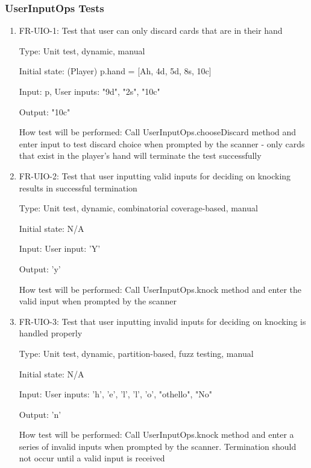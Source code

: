 \documentclass[12pt, titlepage]{article}
\begin{document}
\subsubsection{UserInputOps Tests}
\begin{enumerate}
    \item{FR-UIO-1: Test that user can only discard cards that are in their hand\\}
    
    Type: Unit test, dynamic, manual
    
    Initial state: (Player) p.hand = [Ah, 4d, 5d, 8s, 10c]
    
    Input: p, User inputs: "9d", "2s", "10c"
    
    Output: "10c"
    
    How test will be performed: Call UserInputOps.chooseDiscard method and enter input to test discard choice when prompted by the scanner - only cards that exist in the player's hand will terminate the test successfully
    
    \item{FR-UIO-2: Test that user inputting valid inputs for deciding on knocking results in successful termination\\}
    
    Type: Unit test, dynamic, combinatorial coverage-based, manual
    
    Initial state: N/A
    
    Input: User input: 'Y'
    
    Output: 'y'
    
    How test will be performed: Call UserInputOps.knock method and enter the valid input when prompted by the scanner
    
    \item{FR-UIO-3: Test that user inputting invalid inputs for deciding on knocking is handled properly\\}
    
    Type: Unit test, dynamic, partition-based, fuzz testing, manual
    
    Initial state: N/A
    
    Input: User inputs: 'h', 'e', 'l', 'l', 'o', "othello", "No"
    
    Output: 'n'
    
    How test will be performed: Call UserInputOps.knock method and enter a series of invalid inputs when prompted by the scanner. Termination should not occur until a valid input is received
    

\end{enumerate}
\end{document}
